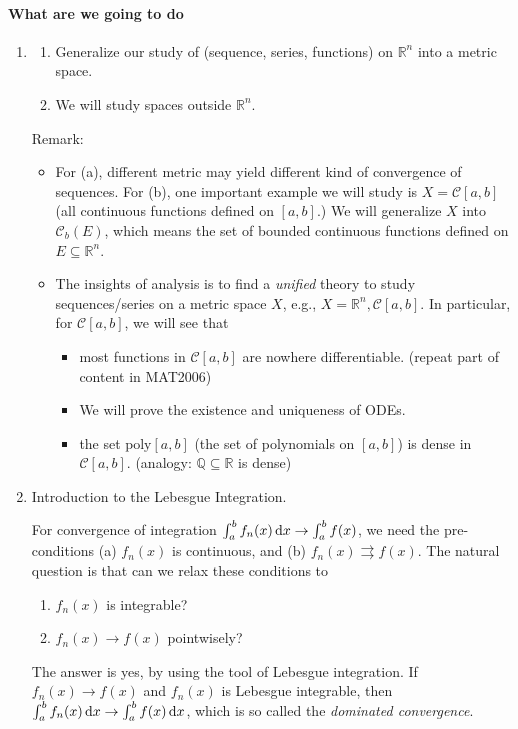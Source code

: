 \paragraph{What are we going to do}
\begin{enumerate}
\item
\begin{enumerate}
\item
Generalize our study of (sequence, series, functions) on $\mathbb{R}^n$ into a metric space.
\item
We will study spaces outside $\mathbb{R}^n$.
\end{enumerate}
Remark: 
\begin{itemize}
\item
For (a), different metric may yield different kind of convergence of sequences. For (b), one important example we will study is $X=\mathcal{C}[a,b]$ (all continuous functions defined on $[a,b]$.) We will generalize $X$ into $\mathcal{C}_b(E)$, which means the set of bounded continuous functions defined on $E\subseteq\mathbb{R}^n$.
\item
The insights of analysis is to find a \emph{unified} theory to study sequences/series on a metric space $X$, e.g., $X=\mathbb{R}^n,\mathcal{C}[a,b]$. In particular, for $\mathcal{C}[a,b]$, we will see that 
\begin{itemize}
\item
most functions in $\mathcal{C}[a,b]$ are nowhere differentiable. (repeat part of content in MAT2006)
\item
We will prove the existence and uniqueness of ODEs.
\item
the set $\mbox{poly}[a,b]$ (the set of polynomials on $[a,b]$) is dense in $\mathcal{C}[a,b]$. (analogy: $\mathbb{Q}\subseteq\mathbb{R}$ is dense)
\end{itemize}
\end{itemize}
\item
Introduction to the Lebesgue Integration. 

For convergence of integration $\int_a^bf_n(x)\,\mathrm{d} x\to\int_a^bf(x)$, we need the pre-conditions (a) $f_n(x)$ is continuous, and (b) $f_n(x) \rightrightarrows f(x)$. The natural question is that can we relax these conditions to 
\begin{enumerate}
\item
$f_n(x)$ is integrable?
\item
$f_n(x)\to f(x)$ pointwisely?
\end{enumerate}
The answer is yes, by using the tool of Lebesgue integration. If $f_n(x)\to f(x)$ and $f_n(x)$ is Lebesgue integrable, then $\int_a^bf_n(x)\,\mathrm{d} x\to \int_a^bf(x)\,\mathrm{d} x$, which is so called the \emph{dominated convergence}.
\end{enumerate}
